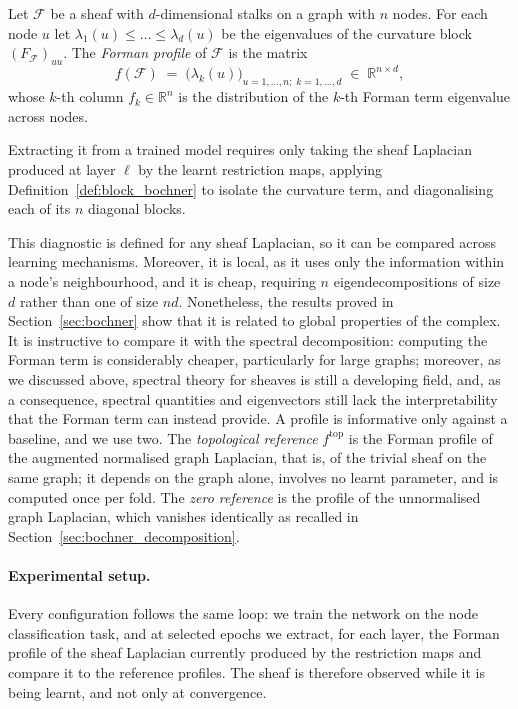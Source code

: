 \begin{definition}
\label{def:forman_profile}
Let $\mathcal{F}$ be a sheaf with $d$-dimensional stalks on a graph with $n$
nodes. For each node $u$ let $\lambda_1(u) \leq \dots \leq \lambda_d(u)$ be the
eigenvalues of the curvature block $(F_{\mathcal{F}})_{uu}$. The \emph{Forman
profile} of $\mathcal{F}$ is the matrix
\[
  f(\mathcal{F}) \;=\; \bigl(\lambda_k(u)\bigr)_{u=1,\dots,n;\; k=1,\dots,d}
  \;\in\; \mathbb{R}^{n\times d},
\]
whose $k$-th column $f_k \in \mathbb{R}^n$ is the distribution of the $k$-th
Forman term eigenvalue across nodes.
\end{definition}

Extracting it from a trained model requires only taking the sheaf Laplacian
produced at layer $\ell$ by the learnt restriction maps, applying
Definition~\ref{def:block_bochner} to isolate the curvature term, and
diagonalising each of its $n$ diagonal blocks. 

This diagnostic is defined for any sheaf Laplacian, so it can be compared across learning mechanisms.
Moreover, it is local, as it uses only the information within a node's neighbourhood, and it is cheap, requiring $n$ eigendecompositions of size $d$ rather than one of size $nd$.
Nonetheless, the results proved in Section~\ref{sec:bochner} show that it is related to global properties of the complex.
It is instructive to compare it with the spectral decomposition:
computing the Forman term is considerably cheaper, particularly for large graphs; moreover, as we discussed above, spectral theory for sheaves is still a developing field, and, as a consequence, spectral quantities and eigenvectors still lack the interpretability that the Forman term can instead provide.
A profile is informative only against a baseline, and we use two. The
\emph{topological reference} $f^{\mathrm{top}}$ is the Forman profile of the
augmented normalised graph Laplacian, that is, of the trivial sheaf on the same
graph; it depends on the graph alone, involves no learnt parameter, and is
computed once per fold. The \emph{zero reference} is the profile of the
unnormalised graph Laplacian, which vanishes identically as recalled in
Section~\ref{sec:bochner_decomposition}.

\paragraph{Experimental setup.}
Every configuration follows the same loop: we train the network on the node
classification task, and at selected epochs we extract, for each layer, the
Forman profile of the sheaf Laplacian currently produced by the restriction
maps and compare it to the reference profiles. The sheaf is therefore observed
while it is being learnt, and not only at convergence.

